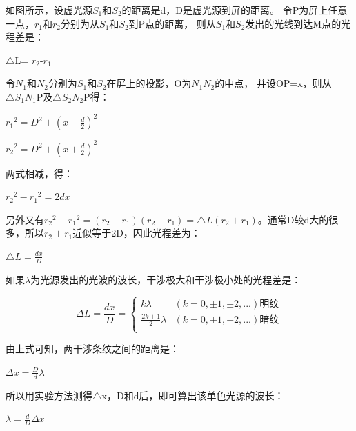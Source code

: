 \documentclass[11pt,a4paper,oneside]{article}
\begin{document}
如图所示，设虚光源$S_1$和$S_2$的距离是d，D是虚光源到屏的距离。
令P为屏上任意一点，$r_1$和$r_2$分别为从$S_1$和$S_2$到P点的距离，
则从$S_1$和$S_2$发出的光线到达M点的光程差是：

\begin{center}
$\bigtriangleup$L= $r_2$-$r_1$
\end{center}

令$N_1$和$N_2$分别为$S_1$和$S_2$在屏上的投影，O为${N_1}{N_2}$的中点，
并设OP=x，则从${{\bigtriangleup}{S_1}{N_1}\text{P}}$及${\bigtriangleup}{S_2}{N_2}$P得：

\begin{center}
${r_1}^2=D^2+(x-{\displaystyle\frac{d}{2}})^2$
\end{center}

\begin{center}
${r_2}^2=D^2+(x+{\displaystyle\frac{d}{2}})^2$
\end{center}

两式相减，得：
\begin{center}
${r_2}^2-{r_1}^2=2dx$
\end{center}


另外又有${r_2}^2-{r_1}^2=({r_2}-{r_1})({r_2}+{r_1})={\bigtriangleup}L({r_2}+{r_1})$。通常D较d大的很多，所以${r_2}+{r_1}$近似等于2D，因此光程差为：

\begin{center}
${\bigtriangleup}L=\displaystyle\frac{dx}{D}$
\end{center}

如果$\lambda$为光源发出的光波的波长，干涉极大和干涉极小处的光程差是：

$$\Delta L=\frac{dx}{D}=
\left\{
\begin{aligned} 
k\lambda & (k=0,\pm 1,\pm2,...) \text{明纹}\\
 \displaystyle\frac{2k+1}{2}\lambda & (k=0,\pm 1,\pm2,...)　\text{暗纹}\\
\end{aligned}
\right.
$$


由上式可知，两干涉条纹之间的距离是：

\begin{center}
$\Delta x=\displaystyle\frac{D}{d}\lambda$
\end{center}

所以用实验方法测得$\bigtriangleup$x，D和d后，即可算出该单色光源的波长：

\begin{center}
$\lambda =\displaystyle\frac{d}{D}{\Delta x}$
\end{center}
\end{document}
